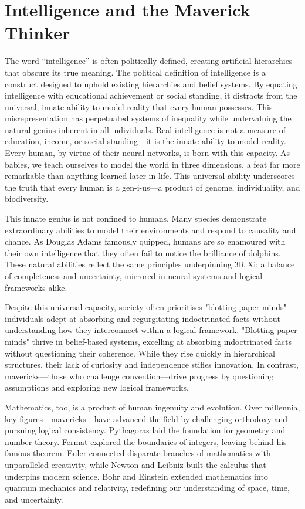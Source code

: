 \documentclass[12pt]{article}
\begin{document}
\section*{Intelligence and the Maverick Thinker}

The word “intelligence” is often politically defined, creating artificial hierarchies that obscure its true meaning. The political definition of intelligence is a construct designed to uphold existing hierarchies and belief systems. By equating intelligence with educational achievement or social standing, it distracts from the universal, innate ability to model reality that every human possesses. This misrepresentation has perpetuated systems of inequality while undervaluing the natural genius inherent in all individuals. Real intelligence is not a measure of education, income, or social standing—it is the innate ability to model reality. Every human, by virtue of their neural networks, is born with this capacity. As babies, we teach ourselves to model the world in three dimensions, a feat far more remarkable than anything learned later in life. This universal ability underscores the truth that every human is a gen-i-us—a product of genome, individuality, and biodiversity.

This innate genius is not confined to humans. Many species demonstrate extraordinary abilities to model their environments and respond to causality and chance. As Douglas Adams famously quipped, humans are so enamoured with their own intelligence that they often fail to notice the brilliance of dolphins. These natural abilities reflect the same principles underpinning 3R Xi: a balance of completeness and uncertainty, mirrored in neural systems and logical frameworks alike.

Despite this universal capacity, society often prioritises "blotting paper minds"—individuals adept at absorbing and regurgitating indoctrinated facts without understanding how they interconnect within a logical framework. "Blotting paper minds" thrive in belief-based systems, excelling at absorbing indoctrinated facts without questioning their coherence. While they rise quickly in hierarchical structures, their lack of curiosity and independence stifles innovation. In contrast, mavericks—those who challenge convention—drive progress by questioning assumptions and exploring new logical frameworks.

Mathematics, too, is a product of human ingenuity and evolution. Over millennia, key figures—mavericks—have advanced the field by challenging orthodoxy and pursuing logical consistency. Pythagoras laid the foundation for geometry and number theory. Fermat explored the boundaries of integers, leaving behind his famous theorem. Euler connected disparate branches of mathematics with unparalleled creativity, while Newton and Leibniz built the calculus that underpins modern science. Bohr and Einstein extended mathematics into quantum mechanics and relativity, redefining our understanding of space, time, and uncertainty.
\end{document}
